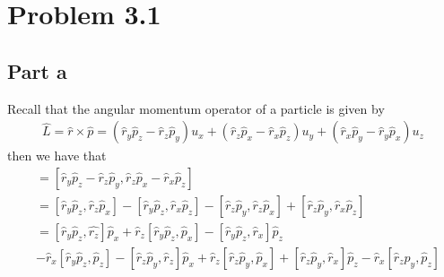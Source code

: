 \documentclass[12pt]{report}
\begin{document}
\maketitle
\section*{Problem 3.1}
\subsection*{Part a}
Recall that the angular momentum operator of a particle is given by
\begin{align*}
  \hat{L} = \hat{r} \times \hat{p} = (\hat{r}_y \hat{p}_z - \hat{r}_z \hat{p}_y) u_x + (\hat{r}_z \hat{p}_x - \hat{r}_x \hat{p}_z) u_y + (\hat{r}_x \hat{p}_y - \hat{r}_y \hat{p}_x) u_z
\end{align*}
then we have that 
\begin{align*}
  [\hat{L}_x, \hat{L}_y] &= [\hat{r}_y \hat{p}_z - \hat{r}_z \hat{p}_y, \hat{r}_z \hat{p}_x - \hat{r}_x \hat{p}_z] \\ 
                         &= [\hat{r}_y\hat{p}_z, \hat{r}_z\hat{p}_x] - [\hat{r}_y\hat{p}_z, \hat{r}_x\hat{p}_z] - [\hat{r}_z\hat{p}_y, \hat{r}_z\hat{p}_x] + [\hat{r}_z\hat{p}_y, \hat{r}_x\hat{p}_z] \\
                         &= [\hat{r}_y\hat{p}_z,\hat{r_z}] \hat{p}_x + \hat{r}_z[\hat{r}_y\hat{p}_z,\hat{p}_x] - [\hat{r}_y\hat{p}_z,\hat{r}_x]\hat{p}_z \\
                         &- \hat{r}_x[\hat{r}_y\hat{p}_z,\hat{p}_z] - [\hat{r}_z\hat{p}_y,\hat{r}_z]\hat{p}_x + \hat{r}_z[\hat{r}_z\hat{p}_y,\hat{p}_x] + [\hat{r}_z\hat{p}_y,\hat{r}_x]\hat{p}_z - \hat{r}_x[\hat{r}_z\hat{p}_y,\hat{p}_z] \\
\end{align*}
\end{document}
